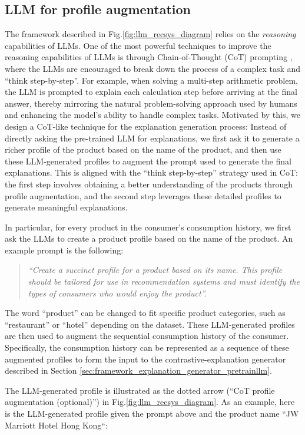 \subsection{LLM for profile augmentation}
\label{sec:framework_llm_profile}
The framework described in Fig.\ref{fig:llm_recsys_diagram} relies on the \emph{reasoning} capabilities of LLMs. One of the most powerful techniques to improve the reasoning capabilities of LLMs is through Chain-of-Thought (CoT) prompting \citep{wei2022chain}, where the LLMs are encouraged to break down the process of a complex task and ``think step-by-step''. For example, when solving a multi-step arithmetic problem, the LLM is prompted to explain each calculation step before arriving at the final answer, thereby mirroring the natural problem-solving approach used by humans and enhancing the model's ability to handle complex tasks. Motivated by this, we design a CoT-like technique for the explanation generation process: Instead of directly asking the pre-trained LLM for explanations, we first ask it to generate a richer profile of the product based on the name of the product, and then use these LLM-generated profiles to augment the prompt used to generate the final explanations. This is aligned with the ``think step-by-step'' strategy used in CoT: the first step involves obtaining a better understanding of the products through profile augmentation, and the second step leverages these detailed profiles to generate meaningful explanations.

In particular, for every product in the consumer's consumption history, we first ask the LLMs to create a product profile based on the name of the product. An example prompt is the following:
\begin{quote}
\emph{``Create a succinct profile for a product based on its name. This profile should be tailored for use in recommendation systems and must identify the types of consumers who would enjoy the product''.}
\end{quote} 
The word ``product'' can be changed to fit specific product categories, such as ``restaurant'' or ``hotel'' depending on the dataset. These LLM-generated profiles are then used to augment the sequential consumption history of the consumer. Specifically, the consumption history can be represented as a sequence of these augmented profiles to form the input to the contrastive-explanation generator described in Section \ref{sec:framework_explanation_generator_pretrainllm}.

The LLM-generated profile is illustrated as the dotted arrow (``CoT profile augmentation (optional)'') in Fig.\ref{fig:llm_recsys_diagram}. As an example, here is the LLM-generated profile given the prompt above and the product name ``JW Marriott Hotel Hong Kong``:

